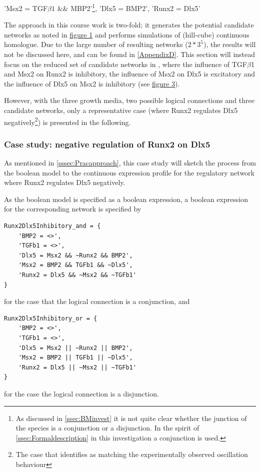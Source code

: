 \documentclass[11pt]{article}
\begin{document}
'Msx2 = TGF$\beta1$ $\&\&$ MBP2'\footnote{As discussed in \ref{ssec:BMinvest} it is not quite clear whether the junction of the species is a conjunction or a disjunction. In the spirit of \ref{ssec:Formaldescription} in this investigation a conjunction is used.}, 'Dlx5 = BMP2', 'Runx2 = Dlx5' 

The approach in this course work is two-fold; it generates the potential candidate networks as noted in \hyperref[GRNs]{figure 1} and performs simulations of (hill-cube) continuous homologue. Due to the large number of resulting networks ($2*3^{5}$), the results will not be discussed here, and can be found in \ref{AppendixD}.
This section will instead focus on the reduced set of candidate networks in \cite{Kirkham}, where the influence of TGF$\beta$1 and Msx2 on Runx2 is inhibitory, the influence of Msx2 on Dlx5 is excitatory and the influence of Dlx5 on Msx2 is inhibitory (see \hyperref[FPGRNs]{figure 3}).

However, with the three growth media, two possible logical connections and three candidate networks, only a representative case (where Runx2 regulates Dlx5 negatively\footnote{The case that \cite{Kirkham} identifies as matching the experimentally observed oscillation behaviour}) is presented in the following.

\subsubsection{Case study: negative regulation of Runx2 on Dlx5} \label{sssec:Casestudy}
As mentioned in \ref{sssec:Pracapproach}, this case study will sketch the process from the boolean model to the continuous expression profile for the regulatory network where Runx2 regulates Dlx5 negatively.

As the boolean model is specified as a boolean expression, a boolean expression for the corresponding network is specified by
\begin{lstlisting}
Runx2Dlx5Inhibitory_and = {
	'BMP2 = <>', 
	'TGFb1 = <>', 
	'Dlx5 = Msx2 && ~Runx2 && BMP2', 
	'Msx2 = BMP2 && TGFb1 && ~Dlx5', 
	'Runx2 = Dlx5 && ~Msx2 && ~TGFb1'
}
\end{lstlisting}
for the case that the logical connection is a conjunction, and 
\begin{lstlisting}
Runx2Dlx5Inhibitory_or = {
	'BMP2 = <>', 
	'TGFb1 = <>', 
	'Dlx5 = Msx2 || ~Runx2 || BMP2', 
	'Msx2 = BMP2 || TGFb1 || ~Dlx5', 
	'Runx2 = Dlx5 || ~Msx2 || ~TGFb1'
}
\end{lstlisting}
for the case the logical connection is a disjunction.
\end{document}
